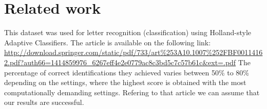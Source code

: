\section{Related work}
This dataset was used for letter recognition (classification) using Holland-style Adaptive Classifiers. The article is available on the following link: \\
\url{http://download.springer.com/static/pdf/733/art%253A10.1007%252FBF00114162.pdf?auth66=1414859976_6267eff4e2e0779ac8c3bd5c7c57b61c&ext=.pdf} 
The percentage of correct identifications they achieved varies between 50\% to 80\% depending on the settings, where the highest score is
obtained with the most computationally demanding settings. Refering to that article we can assume that our results are successful. 





